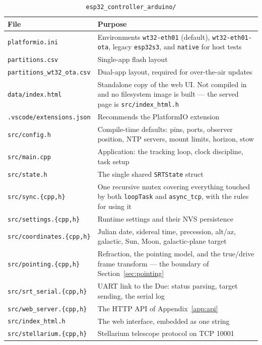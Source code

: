 \documentclass[11pt,a4paper]{article}
\begin{document}
\begin{table}[H]
\centering
\caption{\texttt{esp32\_controller\_arduino/}}
\footnotesize
\begin{tabular}{lp{9.4cm}}
\toprule
\textbf{File} & \textbf{Purpose} \\
\midrule
\texttt{platformio.ini} & Environments \texttt{wt32-eth01} (default), \texttt{wt32-eth01-ota}, legacy \texttt{esp32s3}, and \texttt{native} for host tests \\
\texttt{partitions.csv} & Single-app flash layout \\
\texttt{partitions\_wt32\_ota.csv} & Dual-app layout\index{flash partitions}, required for over-the-air updates \\
\texttt{data/index.html} & Standalone copy of the web UI. Not compiled in and no filesystem image is built --- the served page is \texttt{src/index\_html.h} \\
\texttt{.vscode/extensions.json} & Recommends the PlatformIO extension \\
\midrule
\texttt{src/config.h} & Compile-time defaults: pins, ports, observer position, NTP servers, mount limits, horizon, stow \\
\texttt{src/main.cpp} & Application: the tracking loop, clock discipline, task setup \\
\texttt{src/state.h} & The single shared \texttt{SRTState} struct \\
\texttt{src/sync.\{cpp,h\}} & One recursive mutex\index{cross-task locking!sync.cpp@\texttt{sync.cpp}} covering everything touched by both \texttt{loopTask} and \texttt{async\_tcp}, with the rules for using it \\
\texttt{src/settings.\{cpp,h\}} & Runtime settings and their NVS persistence \\
\texttt{src/coordinates.\{cpp,h\}} & Julian date, sidereal time, precession, alt/az, galactic, Sun, Moon, galactic-plane target \\
\texttt{src/pointing.\{cpp,h\}} & Refraction, the pointing model, and the true/drive frame transform --- the boundary of Section~\ref{sec:pointing} \\
\texttt{src/srt\_serial.\{cpp,h\}} & UART link to the Due: status parsing, target sending, the serial log \\
\texttt{src/web\_server.\{cpp,h\}} & The HTTP API of Appendix~\ref{app:api} \\
\texttt{src/index\_html.h} & The web interface, embedded as one string \\
\texttt{src/stellarium.\{cpp,h\}} & Stellarium telescope protocol on TCP 10001 \\

\end{tabular}
\end{table}
\end{document}

